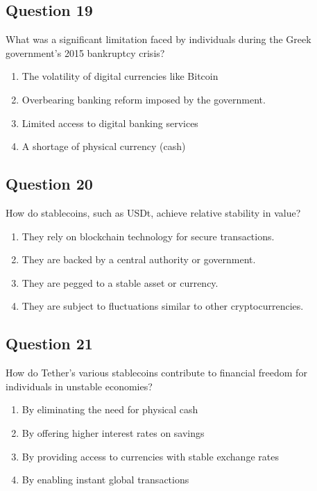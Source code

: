 \documentclass[12pt,a4paper]{article}
\begin{document}
\bigskip


\subsection*{Question 19}
What was a significant limitation faced by individuals during the Greek government's 2015 bankruptcy crisis?

\begin{enumerate}[label=\Alph*., leftmargin=*]
\item The volatility of digital currencies like Bitcoin
\item Overbearing banking reform imposed by the government.
\item Limited access to digital banking services
\item A shortage of physical currency (cash)
\end{enumerate}

\bigskip


\subsection*{Question 20}
How do stablecoins, such as USDt, achieve relative stability in value?

\begin{enumerate}[label=\Alph*., leftmargin=*]
\item They rely on blockchain technology for secure transactions.
\item They are backed by a central authority or government.
\item They are pegged to a stable asset or currency.
\item They are subject to fluctuations similar to other cryptocurrencies.
\end{enumerate}

\bigskip


\subsection*{Question 21}
How do Tether’s various stablecoins contribute to financial freedom for individuals in unstable economies?

\begin{enumerate}[label=\Alph*., leftmargin=*]
\item By eliminating the need for physical cash
\item By offering higher interest rates on savings
\item By providing access to currencies with stable exchange rates
\item By enabling instant global transactions
\end{enumerate}
\end{document}
